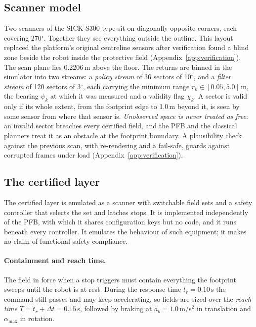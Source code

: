 \documentclass[11pt]{article}
\theoremstyle{definition}
\begin{document}
\subsection{Scanner model}
Two scanners of the SICK S300 type sit on diagonally opposite corners, each covering 270$^\circ$. Together they see everything outside the outline. This layout replaced the platform's original centreline sensors after verification found a blind zone beside the robot inside the protective field (Appendix~\ref{app:verification}). The scan plane lies 0.2206\,m above the floor. The returns are binned
in the simulator into two streams: a \emph{policy stream} of 36 sectors of 10$^\circ$, and a \emph{filter
stream} of 120 sectors of 3$^\circ$, each carrying the minimum range $r_k\in[0.05,5.0]$\,m, the bearing
$\psi_k$ at which it was measured and a validity flag $\chi_k$. A sector is valid only if its whole
extent, from the footprint edge to 1.0\,m beyond it, is seen by some sensor from where that sensor is.
\emph{Unobserved space is never treated as free}: an invalid sector breaches every certified field, and
the PFB and the classical planners treat it as an obstacle at the footprint boundary. A plausibility
check against the previous scan, with re-rendering and a fail-safe, guards against corrupted frames under
load (Appendix~\ref{app:verification}).

\subsection{The certified layer}\label{sec:certified}
The certified layer is emulated as a scanner with switchable field sets and a safety controller that
selects the set and latches stops. It is implemented independently of the PFB, with which it shares
configuration keys but no code, and it runs beneath every controller. It emulates the behaviour of such
equipment; it makes no claim of functional-safety compliance.

\paragraph{Containment and reach time.} The field in force when a stop triggers must contain everything
the footprint sweeps until the robot is at rest. During the response time $t_r=0.10$\,s the command still
passes and may keep accelerating, so fields are sized over the \emph{reach time}
$T=t_r+\Delta t=0.15$\,s, followed by braking at $a_b=1.0$\,m/s$^2$ in translation and $\alpha_{\max}$ in
rotation.
\end{document}
